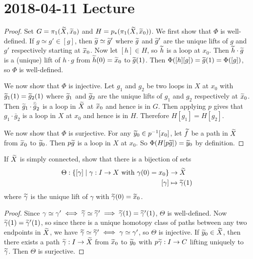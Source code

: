 \section{2018-04-11 Lecture}

\begin{proof}
	Set $G=\pi_1(\widetilde X,\widetilde x_0)$ and $H=p_*(\pi_1(\widetilde X,\widetilde x_0))$.
	We first show that $\Phi$ is well-defined.
	If $g \simeq g' \in [g]$, then $\widetilde g \simeq \widetilde g'$ where $\widetilde g$ and $\widetilde g'$ are the unique lifts of $g$ and $g'$ respectively starting at $\widetilde x_0$.
	Now let $[h] \in H$, so $\widetilde h$ is a loop at $x_0$.
	Then $\widetilde h \cdot \widetilde g$ is a (unique) lift of $h \cdot g$ from $\widetilde h(0)=\widetilde x_0$ to $\widetilde g(1)$.
	Then $\Phi([h][g])=\widetilde g(1) = \Phi([g])$, so $\Phi$ is well-defined.
	
	We now show that $\Phi$ is injective.
	Let $g_1$ and $g_2$ be two loops in $X$ at $x_0$ with $\widetilde g_1(1) = \widetilde g_2(1)$ where $\widetilde g_1$ and $\widetilde g_2$ are the unique lifts of $g_1$ and $g_2$ respectively at $\widetilde x_0$.
	Then $\widetilde g_1 \cdot \bar{\widetilde g}_2$ is a loop in $\widetilde X$ at $\widetilde x_0$ and hence is in $G$.
	Then applying $p$ gives that $g_1 \cdot \bar g_2$ is a loop in $X$ at $x_0$ and hence is in $H$.
	Therefore $H[g_1]=H[g_2]$.
	
	We now show that $\Phi$ is surjective.
	For any $\widetilde y_0 \in p^{-1}[x_0]$, let $\widetilde f$ be a path in $\widetilde X$ from $\widetilde x_0$ to $\widetilde y_0$.
	Then $p\widetilde g$ is a loop in $X$ at $x_0$.
	So $\Phi(H[p\widetilde g]) = \widetilde y_0$ by definition.
\end{proof}

\begin{exer}
	If $\widetilde X$ is simply connected, show that there is a bijection of sets
	\begin{align*}
		\Theta: \left\{[\gamma] \mid \gamma:I \to X \text{ with } \gamma(0)=x_0\right\} &\to \widetilde X \\
		[\gamma] &\mapsto \widetilde \gamma(1)
	\end{align*}
	where $\widetilde\gamma$ is the unique lift of $\gamma$ with $\widetilde\gamma(0)=\widetilde x_0$.
\end{exer}

\begin{proof}
	Since $\gamma \simeq \gamma' \iff \widetilde \gamma \simeq \widetilde \gamma' \implies \widetilde\gamma(1) = \widetilde\gamma'(1)$, $\Theta$ is well-defined.
	Now $\widetilde\gamma(1)=\widetilde\gamma'(1)$, so since there is a unique homotopy class of paths between any two endpoints in $\widetilde X$, we have $\widetilde\gamma \simeq \widetilde\gamma' \iff \gamma \simeq \gamma'$, so $\Theta$ is injective.
	If $\widetilde y_0 \in \widetilde X$, then there exists a path $\widetilde\gamma: I \to \widetilde X$ from $\widetilde x_0$ to $\widetilde y_0$ with $p\widetilde\gamma: I \to C$ lifting uniquely to $\widetilde\gamma$.
	Then $\Theta$ is surjective.
\end{proof}

